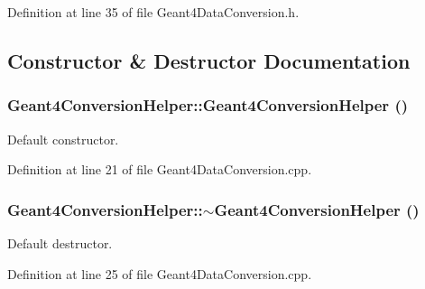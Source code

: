 Definition at line 35 of file Geant4DataConversion.h.

\subsection{Constructor \& Destructor Documentation}
\hypertarget{class_d_d4hep_1_1_simulation_1_1_geant4_conversion_helper_a58610a40f83c77313587b7eb8eddcd40}{
\subsubsection[{Geant4ConversionHelper}]{\setlength{\rightskip}{0pt plus 5cm}Geant4ConversionHelper::Geant4ConversionHelper ()}}
\label{class_d_d4hep_1_1_simulation_1_1_geant4_conversion_helper_a58610a40f83c77313587b7eb8eddcd40}


Default constructor. 

Definition at line 21 of file Geant4DataConversion.cpp.\hypertarget{class_d_d4hep_1_1_simulation_1_1_geant4_conversion_helper_ae69165a68948c43f52a9ef1f30b29ec0}{
\subsubsection[{$\sim$Geant4ConversionHelper}]{\setlength{\rightskip}{0pt plus 5cm}Geant4ConversionHelper::$\sim$Geant4ConversionHelper ()}}
\label{class_d_d4hep_1_1_simulation_1_1_geant4_conversion_helper_ae69165a68948c43f52a9ef1f30b29ec0}


Default destructor. 

Definition at line 25 of file Geant4DataConversion.cpp.

